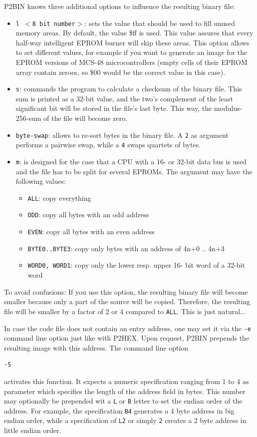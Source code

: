 \documentclass[12pt,twoside]{report}
\newcommand{\tty}[1]{{\tt #1}}
\begin{document}
P2BIN knows three additional options to influence the resulting binary
file:
\begin{itemize}
\item{\tty{l $<$8 bit number$>$}: sets the value that should be used to fill
      unused memory areas.  By default, the value
      \$ff is used.  This value assures that every
      half-way intelligent EPROM burner will skip
      these areas.  This option allows to set different values,
      for example if you want to
      generate an image for the EPROM versions of
      MCS-48 microcontrollers (empty cells of their
      EPROM array contain zeroes, so \$00 would be
      the correct value in this case).}
\item{\tty{s}: commands the program to calculate a checksum
      of the binary file.  This sum is printed as
      a 32-bit value, and the two's complement of
      the least significant bit will be stored in
      the file's last byte.  This way, the modulus-
      256-sum of the file will become zero.}
\item{\tty{byte-swap}: allows to re-sort bytes in the
      binary file.  A \tty{2} as argument performs a pairwise
      swap, while a \tty{4} swaps quartets of bytes.}
\item{\tty{m}: is designed for the case that a CPU with a
      16- or 32-bit data bus is used and the file
      has to be split for several EPROMs.  The
      argument may have the following values:
      \begin{itemize}
      \item{\tty{ALL}: copy everything}
      \item{\tty{ODD}: copy all bytes with an odd address}
      \item{\tty{EVEN}: copy all bytes with an even address}
      \item{\tty{BYTE0..BYTE3}: copy only bytes with an address of
            4n+0 .. 4n+3}
      \item{\tty{WORD0, WORD1}: copy only the lower resp. upper 16-
            bit word of a 32-bit word}
      \end{itemize}}
\end{itemize}
To avoid confusions: If you use this option, the resulting binary file
will become smaller because only a part of the source will be copied.
Therefore, the resulting file will be smaller by a factor of 2 or 4
compared to \tty{ALL}.  This is just natural...

In case the code file does not contain an entry address, one may set
it via the \tty{-e} command line option just like with P2HEX.  Upon
request, P2BIN prepends the resulting image with this address.  The
command line option
\begin{verbatim}
-S
\end{verbatim}
activates this function.  It expects a numeric specification ranging
from 1 to 4 as parameter which specifies the length of the address
field in bytes.  This number may optionally be prepended wit a \tty{L} or
\tty{B} letter to set the endian order of the address.  For example, the
specification \tty{B4} generates a 4 byte address in big endian order,
while a specification of \tty{L2} or simply \tty{2} creates a 2 byte address
in little endian order.
\end{document}
